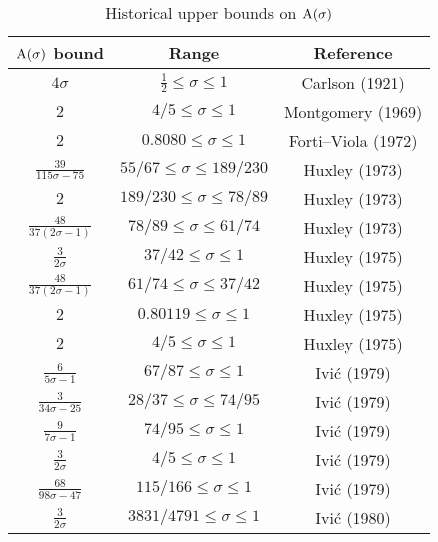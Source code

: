 \begin{table}[ht]
    \def\arraystretch{1.3}
    \centering
    \caption{Historical upper bounds on $\mathrm{A}(\sigma)$}
    \begin{tabular}{|c|c|c|}
    \hline
    $\mathrm{A}(\sigma)$ bound & Range & Reference\\
    \hline
    $4\sigma$ & $\frac{1}{2} \leq \sigma \le 1$ & Carlson (1921) \cite{carlson_uber_1921}\\
    \hline
    $2$ & $4/5 \leq \sigma \leq 1$ & Montgomery (1969) \cite{montgomery_1969} \\
    \hline
    $2$ & $0.8080 \leq \sigma \leq 1$ & Forti--Viola (1972) \cite{forti-viola} \\
    \hline
    $\frac{39}{115\sigma-75}$ & $55/67 \leq \sigma \leq 189/230$ & Huxley (1973) \cite{huxley_large_1973} \\
    \hline
    $2$ & $189/230 \leq \sigma \leq 78/89$ & Huxley (1973) \cite{huxley_large_1973} \\
    \hline
    $\frac{48}{37(2\sigma-1)}$ & $78/89 \leq \sigma \leq 61/74$ & Huxley (1973) \cite{huxley_large_1973} \\
    \hline
    $\frac{3}{2\sigma}$ & $37/42 \leq \sigma \leq 1$ & Huxley (1975) \cite{huxley_large_1975a}\\
    \hline
    $\frac{48}{37(2\sigma-1)}$ & $61/74 \leq \sigma \leq 37/42$ & Huxley (1975) \cite{huxley_large_1975a}\\
    \hline
    $2$ & $0.80119 \leq \sigma \leq 1$ & Huxley (1975) \cite{huxley_large_1975a}\\
    \hline
    $2$ & $4/5 \leq \sigma \leq 1$ & Huxley (1975) \cite{huxley_large_1975b}\\
    \hline
    $\frac{6}{5\sigma-1}$ & $67/87 \leq \sigma \leq 1$ & Ivi\'c (1979) \cite{ivic_note_1979} \\
    \hline
    $\frac{3}{34\sigma-25}$ & $28/37 \leq \sigma \leq 74/95$ & Ivi\'c (1979) \cite{ivic_note_1979} \\
    \hline
    $\frac{9}{7\sigma-1}$ & $74/95 \leq \sigma \leq 1$ & Ivi\'c (1979) \cite{ivic_note_1979} \\
    \hline
    $\frac{3}{2\sigma}$ & $4/5 \leq \sigma \leq 1$ & Ivi\'c (1979) \cite{ivic_note_1979} \\
    \hline
    $\frac{68}{98\sigma-47}$ & $115/166 \leq \sigma \leq 1$ & Ivi\'c (1979) \cite{ivic_note_1979} \\
    \hline
    $\frac{3}{2\sigma}$ & $3831/4791 \leq \sigma \leq 1$ & Ivi\'c (1980) \cite{ivic_exponent_pairs}  \\

\end{tabular}
\end{table}
